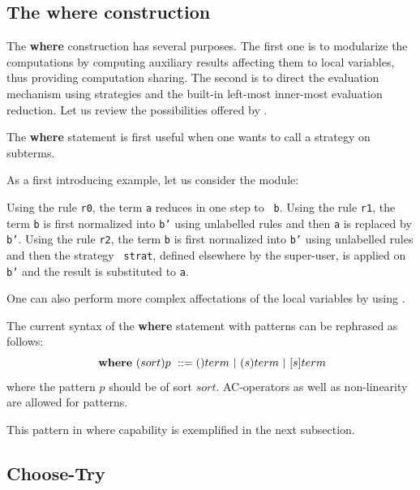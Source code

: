 \subsection{The where construction}
\label{subsec.where.construction}

The {\bf where} construction has several purposes. The first one is to
modularize the computations by computing auxiliary results affecting
them to local variables, thus providing computation sharing. The
second is to direct the evaluation mechanism using strategies and the
built-in left-most inner-most evaluation reduction. Let us review the
possibilities offered by \elan.

The {\bf where} statement is first useful when one wants to
call a strategy on subterms.

\EX As a first introducing example, let us consider the module:

Using the rule {\tt r0}, the term {\tt a} reduces in one step to {\tt
b}. Using the rule {\tt r1}, the term {\tt b} is first normalized into
{\tt b'} using unlabelled rules and then {\tt a} is replaced by {\tt
b'}.  Using the rule {\tt r2}, the term {\tt b} is first normalized
into {\tt b'} using unlabelled rules and then the strategy {\tt
strat}, defined elsewhere by the super-user, is applied on {\tt b'}
and the result is substituted to {\tt a}.

\FEX

One can also perform more complex affectations of the local variables
by using .

The current syntax of the {\bf where} statement with patterns
  can be
rephrased as follows:
\[
  {\bf ~where~} (sort)p ~::= ()term ~|~ (s)term ~|~ [s]term
\]
where the pattern $p$ should be of sort $sort$.
AC-operators as well as non-linearity are allowed for patterns.

This pattern in where capability is exemplified in the next
subsection.

\subsection{Choose-Try}


